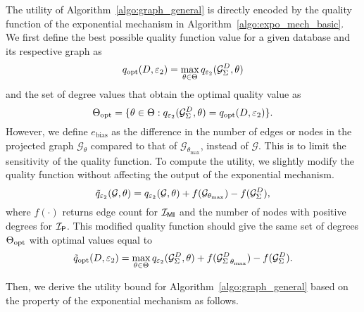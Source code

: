 The utility of Algorithm~\ref{algo:graph_general} is directly encoded by the quality function of the exponential mechanism in Algorithm~\ref{algo:expo_mech_basic}. 
We first define the best possible quality function value for a given database and its respective graph as 
\begin{equation}
    q_{\normalfont{\text{opt}}}(D,\varepsilon_2) = \max_{\theta\in \Theta} q_{\varepsilon_2}({\mathcal{G}_{{\Sigma}}^{D}},\theta)
\end{equation}
and the set of degree values that obtain the optimal quality value as 
\begin{equation}
 \Theta_{\normalfont{\text{opt}}} = \{\theta\in \Theta: q_{\varepsilon_2}({\mathcal{G}_{{\Sigma}}^{D}},\theta) = q_{\normalfont{\text{opt}}}(D,\varepsilon_2) \}.   \end{equation} 
However, we define $e_{\text{bias}}$ as the difference in the number of edges or nodes in the projected graph $\mathcal{G}_{\theta}$ compared to that of $\mathcal{G}_{\theta_{\max}}$, instead of $\mathcal{G}$. This is to limit the sensitivity of the quality function. To compute the utility, we slightly modify the quality function without affecting the output of the exponential mechanism. 
\begin{equation}
    \tilde{q}_{\varepsilon_2}(\mathcal{G},\theta) = q_{\varepsilon_2}(\mathcal{G},\theta) + f(\mathcal{G}_{\theta_{\max}}) - f({\mathcal{G}_{{\Sigma}}^{D}}),
\end{equation}
where $f(\cdot)$ returns edge count for $\mathcal{I_{\mathsf{MI}}}$ and the number of nodes with positive degrees for $\mathcal{I_\mathsf{P}}$.
This modified quality function should give the same set of degrees $\Theta_{\normalfont{\text{opt}}}$ with optimal values equal to 
\begin{equation}
    \tilde{q}_{\normalfont{\text{opt}}}(D,\varepsilon_2) = \max_{\theta\in \Theta} q_{\varepsilon_2}({\mathcal{G}_{{\Sigma}}^{D}},\theta) + f({\mathcal{G}_{{\Sigma}}^{D}}_{\theta_{\max}}) - f({\mathcal{G}_{{\Sigma}}^{D}}).
\end{equation}


Then, we derive the utility bound for Algorithm~\ref{algo:graph_general} based on the property of the exponential mechanism as follows. 


